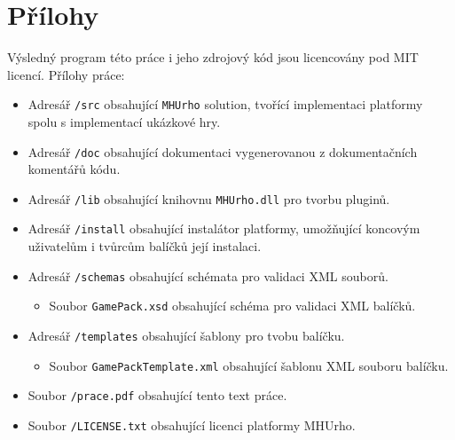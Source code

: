\documentclass[12pt,a4paper,usenames]{report}
\let\openright=\clearpage
\begin{document}
\chapter{Přílohy}
\label{sec:appendix}
Výsledný program této práce i jeho zdrojový kód jsou licencovány pod MIT licencí.
Přílohy práce:
\begin{itemize}
	\item Adresář \texttt{/src} obsahující \texttt{MHUrho} solution, tvořící implementaci platformy spolu s implementací ukázkové hry. 
	\item Adresář \texttt{/doc} obsahující dokumentaci vygenerovanou z dokumentačních komentářů kódu.
	\item Adresář \texttt{/lib} obsahující knihovnu \texttt{MHUrho.dll} pro tvorbu pluginů.
	\item Adresář \texttt{/install} obsahující instalátor platformy, umožňující koncovým uživatelům i tvůrcům balíčků její instalaci.
	\item Adresář \texttt{/schemas} obsahující schémata pro validaci XML souborů.
		\begin{itemize}
			\item Soubor \texttt{GamePack.xsd} obsahující schéma pro validaci XML balíčků.
		\end{itemize}
	\item Adresář \texttt{/templates} obsahující šablony pro tvobu balíčku.
		\begin{itemize}
			\item Soubor \texttt{GamePackTemplate.xml} obsahující šablonu XML souboru balíčku.
		\end{itemize}
	\item Soubor \texttt{/prace.pdf} obsahující tento text práce.
	\item Soubor \texttt{/LICENSE.txt} obsahující licenci platformy MHUrho.
\end{itemize}

\openright
\end{document}
